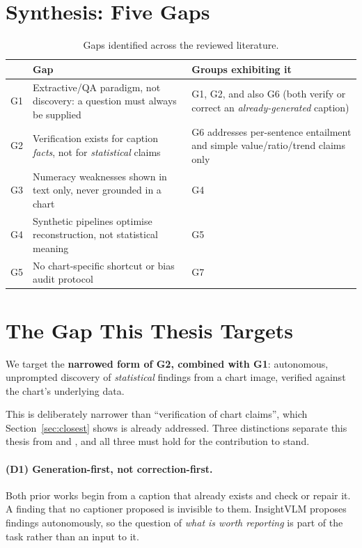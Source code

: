 \section{Synthesis: Five Gaps}
\label{sec:gaps}

\begin{table}[t]\centering\small
\caption{Gaps identified across the reviewed literature.}
\label{tab:litgaps}
\begin{tabular}{p{0.8cm}p{6.2cm}p{6.6cm}}
\toprule
& \textbf{Gap} & \textbf{Groups exhibiting it} \\
\midrule
G1 & Extractive/QA paradigm, not discovery: a question must always be supplied &
G1, G2, and also G6 (both verify or correct an \emph{already-generated} caption) \\
G2 & Verification exists for caption \emph{facts}, not for \emph{statistical}
claims &
G6 addresses per-sentence entailment and simple value/ratio/trend claims only \\
G3 & Numeracy weaknesses shown in text only, never grounded in a chart & G4 \\
G4 & Synthetic pipelines optimise reconstruction, not statistical meaning & G5 \\
G5 & No chart-specific shortcut or bias audit protocol & G7 \\
\bottomrule
\end{tabular}
\end{table}

\section{The Gap This Thesis Targets}
\label{sec:ourgap}

We target the \textbf{narrowed form of G2, combined with G1}: autonomous,
unprompted discovery of \emph{statistical} findings from a chart image, verified
against the chart's underlying data.

This is deliberately narrower than ``verification of chart claims'', which
Section~\ref{sec:closest} shows is already addressed. Three distinctions separate
this thesis from \citet{chocolate} and \citet{techrxiv}, and all three must hold
for the contribution to stand.

\paragraph{(D1) Generation-first, not correction-first.} Both prior works begin
from a caption that already exists and check or repair it. A finding that no
captioner proposed is invisible to them. InsightVLM proposes findings
autonomously, so the question of \emph{what is worth reporting} is part of the
task rather than an input to it.

